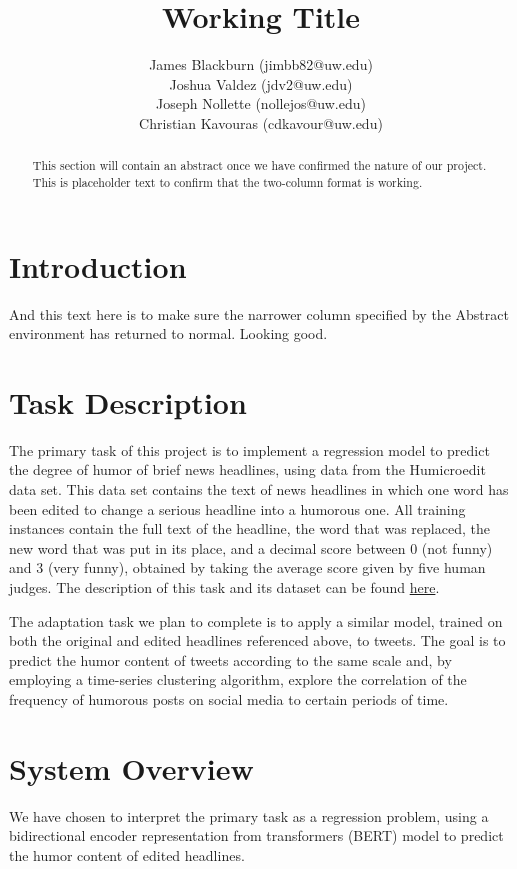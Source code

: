 \documentclass{article}
\title{Working Title}
\author{
James Blackburn (jimbb82@uw.edu)\\
Joshua Valdez (jdv2@uw.edu)\\
Joseph Nollette (nollejos@uw.edu)\\
Christian Kavouras (cdkavour@uw.edu)
}
\date{\vspace{-5ex}}
\begin{document}
\maketitle

\begin{abstract}
This section will contain an abstract once we have confirmed the nature of our project. This is placeholder text to confirm that the two-column format is working.
\end{abstract}

\section{Introduction}
And this text here is to make sure the narrower column specified by the Abstract environment has returned to normal. Looking good.

\section{Task Description}
The primary task of this project is to implement a regression model to predict the degree of humor of brief news headlines, using data from the Humicroedit data set. This data set contains the text of news headlines in which one word has been edited to change a serious headline into a humorous one. All training instances contain the full text of the headline, the word that was replaced, the new word that was put in its place, and a decimal score between 0 (not funny) and 3 (very funny), obtained by taking the average score given by five human judges. The description of this task and its dataset can be found \href{https://competitions.codalab.org/competitions/20970}{here}.\cite{hossain-etal-2019-president}

The adaptation task we plan to complete is to apply a similar model, trained on both the original and edited headlines referenced above, to tweets. The goal is to predict the humor content of tweets according to the same scale and, by employing a time-series clustering algorithm, explore the correlation of the frequency of humorous posts on social media to certain periods of time.

\section{System Overview}

We have chosen to interpret the primary task as a regression problem, using a bidirectional encoder representation from transformers (BERT) model to predict the humor content of edited headlines.
\end{document}
